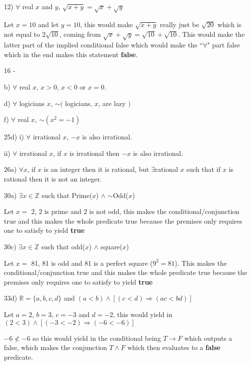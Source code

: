 \documentclass[11pt]{article}
\newcommand\tab[1][.8 cm]{\hspace*{#1}}
\begin{document}
\begin{flushleft}
12) $\forall$ real $x$ and $y$, $\sqrt{x+y} = \sqrt{x} + \sqrt{y}$

Let $x = 10$ and let $y = 10$, this would make $\sqrt{x+y}$ really just be $\sqrt{20}$ which is not equal to $2\sqrt{10}$, coming from $\sqrt{x} + \sqrt{y} = \sqrt{10} + \sqrt{10}$. This would make the latter part of the implied conditional false which would make the ``$\forall$" part false which in the end makes this statement \textbf{false}.

\hrulefill

16 - 

b) $\forall$ real $x$, $x > 0$, $x < 0$ or $x = 0$.

d) $\forall$ logicians $x$, $\sim ($ logicians, $x$, are lazy $)$

f) $\forall$ real $x$, $\sim (x^2= -1)$

\hrulefill

25d) i) $\forall$ irrational $x$, $-x$ is also irrational.

\tab ii) $\forall$ irrational $x$, if $x$ is irrational then $-x$ is also irrational.

\hrulefill

26a) $\forall x$, if $x$ is an integer then it is rational, but $\exists $rational $x$ such that if $x$ is rational then it is not an integer. 

\hrulefill

30a) $\exists x \in \mathbb{Z}$ such that Prime($x$) $\land$ $\sim$Odd($x$)

Let $x = $ 2, 2 is prime and 2 is not odd, this makes the conditional/conjunction true and this makes the whole predicate true because the premises only requires one to satisfy to yield \textbf{true}

\hrulefill

30c) $\exists x \in \mathbb{Z}$ such that odd($x$) $\land$ square($x$)

Let $x=$ 81, 81 is odd and 81 is a perfect square ($9^2 = 81$). This makes the conditional/conjunction true and this makes the whole predicate true because the premises only requires one to satisfy to yield \textbf{true}

\hrulefill

33d) $\mathbb{R} = \{ a, b, c, d\}$ and $(a < b) \land [ (c < d) \Rightarrow (ac < bd) ]$

Let $a = 2$, $b = 3$, $c = -3$ and $d = -2$, this would yield in $(2 < 3) \land [(-3 < -2) \Rightarrow (-6 < -6)]$

$-6 \nless -6$ so this would yield in the conditional being $T \to F$ which outputs a false, which makes the conjunction $T \land F$ which then evaluates to a \textbf{false} predicate.






\hrulefill
\end{flushleft}
\end{document}
